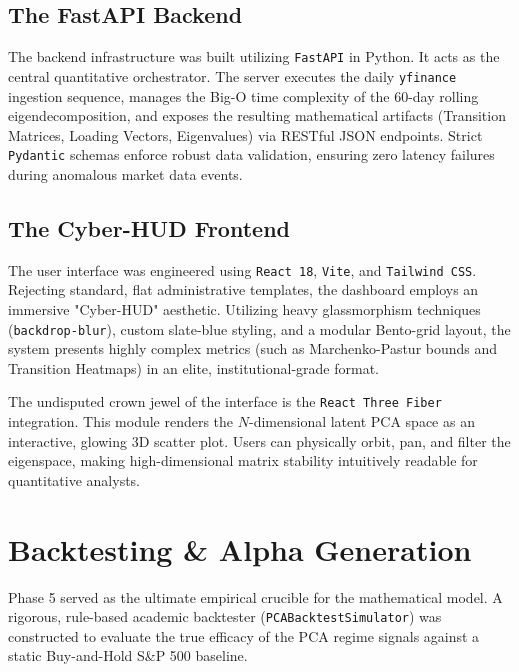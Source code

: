 \documentclass[12pt,twoside]{report}
\begin{document}
\section{The FastAPI Backend}
The backend infrastructure was built utilizing \texttt{FastAPI} in Python. It acts as the central quantitative orchestrator. The server executes the daily \texttt{yfinance} ingestion sequence, manages the Big-O time complexity of the 60-day rolling eigendecomposition, and exposes the resulting mathematical artifacts (Transition Matrices, Loading Vectors, Eigenvalues) via RESTful JSON endpoints. Strict \texttt{Pydantic} schemas enforce robust data validation, ensuring zero latency failures during anomalous market data events.

\section{The Cyber-HUD Frontend}
The user interface was engineered using \texttt{React 18}, \texttt{Vite}, and \texttt{Tailwind CSS}. Rejecting standard, flat administrative templates, the dashboard employs an immersive "Cyber-HUD" aesthetic. Utilizing heavy glassmorphism techniques (\texttt{backdrop-blur}), custom slate-blue styling, and a modular Bento-grid layout, the system presents highly complex metrics (such as Marchenko-Pastur bounds and Transition Heatmaps) in an elite, institutional-grade format. 

The undisputed crown jewel of the interface is the \texttt{React Three Fiber} integration. This module renders the $N$-dimensional latent PCA space as an interactive, glowing 3D scatter plot. Users can physically orbit, pan, and filter the eigenspace, making high-dimensional matrix stability intuitively readable for quantitative analysts.

\chapter{Backtesting \& Alpha Generation}
Phase 5 served as the ultimate empirical crucible for the mathematical model. A rigorous, rule-based academic backtester (\texttt{PCABacktestSimulator}) was constructed to evaluate the true efficacy of the PCA regime signals against a static Buy-and-Hold S\&P 500 baseline.
\end{document}
